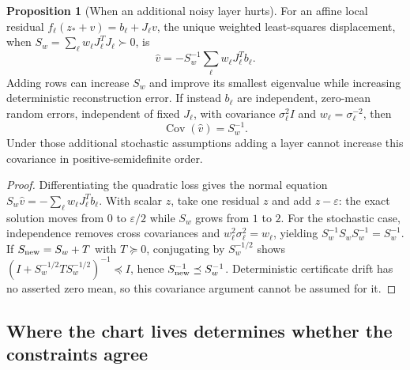 \documentclass[11pt,a4paper]{article}
\theoremstyle{definition}
\newtheorem{proposition}[theorem]{Proposition}
\theoremstyle{definition}
\theoremstyle{remark}\newtheorem{remark}[theorem]{Remark}
\begin{document}
\begin{proposition}[When an additional noisy layer hurts]\label{prop:hurt}
For an affine local residual $f_\ell(z_*+v)=b_\ell+J_\ell v$, the unique weighted least-squares displacement, when $S_w=\sum_\ell w_\ell J_\ell^TJ_\ell\succ0$, is
\[
\widehat v=-S_w^{-1}\sum_\ell w_\ell J_\ell^Tb_\ell.
\]
Adding rows can increase $S_w$ and improve its smallest eigenvalue while increasing deterministic reconstruction error. If instead $b_\ell$ are independent, zero-mean random errors, independent of fixed $J_\ell$, with covariance $\sigma_\ell^2I$ and $w_\ell=\sigma_\ell^{-2}$, then
\[
\operatorname{Cov}(\widehat v)=S_w^{-1}.
\]
Under those additional stochastic assumptions adding a layer cannot increase this covariance in positive-semidefinite order.
\end{proposition}
\begin{proof}
Differentiating the quadratic loss gives the normal equation $S_w\widehat v=-\sum_\ell w_\ell J_\ell^Tb_\ell$. With scalar $z$, take one residual $z$ and add $z-\varepsilon$: the exact solution moves from $0$ to $\varepsilon/2$ while $S_w$ grows from $1$ to $2$. For the stochastic case, independence removes cross covariances and $w_\ell^2\sigma_\ell^2=w_\ell$, yielding $S_w^{-1}S_wS_w^{-1}=S_w^{-1}$. If $S_{\rm new}=S_w+T$ with $T\succeq0$, conjugating by $S_w^{-1/2}$ shows $(I+S_w^{-1/2}TS_w^{-1/2})^{-1}\preceq I$, hence $S_{\rm new}^{-1}\preceq S_w^{-1}$. Deterministic certificate drift has no asserted zero mean, so this covariance argument cannot be assumed for it.
\end{proof}

\subsection{Where the chart lives determines whether the constraints agree}
\end{document}
